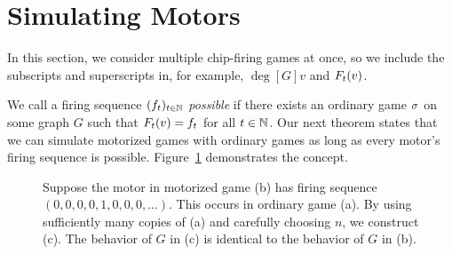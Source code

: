 \section{Simulating Motors} \label{simulatingMotors}
\showgame

In this section, we consider multiple chip-firing games at once, so we include
the subscripts and superscripts in, for example, $\deg[G]{v}$ and
$\firing{v}{t}$.

We call a firing sequence $(f_t)_{t \in \mathbb{N}}$ \emph{possible} if there exists
an ordinary game $\sigma$ on some graph $G$ such that $\firing{v}{t} = f_{t}$ for
all $t \in \mathbb{N}$. Our next theorem states that we can simulate motorized games
with ordinary games as long as every motor's firing sequence is
possible. Figure~\ref{natMot} demonstrates the concept.
\begin{figure}[tbh]
  \centering
  \caption{Suppose the motor in motorized game (b) has firing sequence
    $(0,0,0,0,1,0,0,0,\dots)$. This occurs in ordinary game (a). By using
    sufficiently many copies of (a) and carefully choosing $n$, we construct
    (c). The behavior of $G$ in (c) is identical to the behavior of $G$ in
    (b).}
\label{natMot}
\end{figure}

